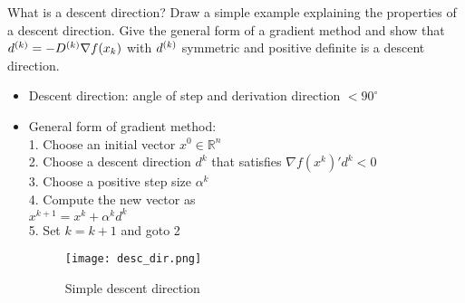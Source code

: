 \documentclass{article}
\begin{document}
\begin{question}
  What is a descent direction? Draw a simple example explaining the properties of a descent
  direction. Give the general form of a gradient method and show that
  \(d^{(k)} = -D^{(k)} \nabla f(x_k)\) with \(d^{(k)}\) symmetric and positive definite is a descent
  direction.
\end{question}
\begin{itemize}
\item Descent direction: angle of step and derivation direction $< 90^\circ$
\item General form of gradient method: \\
  1. Choose an initial vector $x ^0 \in \mathbb{R}^n$\\
  2. Choose a descent direction $d^k$ that satisfies $\nabla f (x^k)'  d^k < 0$\\
  3. Choose a positive step size $\alpha^k$\\
  4. Compute the new vector as\\
  $x^{k+1} = x^k + \alpha^k d^k$\\
  5. Set $k = k + 1$ and goto 2
  \begin{figure}[H]
    \texttt{[image: desc\_dir.png]}
    \caption{Simple descent direction\label{fig:desc_dir}}
  \end{figure}
\end{itemize}
\end{document}
